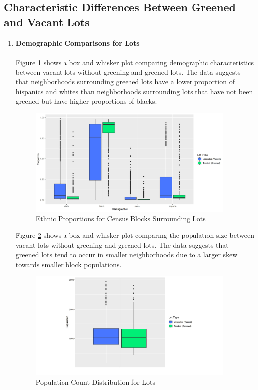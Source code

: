 \documentclass{article}
\begin{document}
\subsection{Characteristic Differences Between Greened and Vacant Lots}
\begin{enumerate}
    \item \textbf{Demographic Comparisons for Lots} \\\\
    Figure \ref{fig:figure3} shows a box and whisker plot comparing demographic characteristics between vacant lots without greening and greened lots. The data suggests that neighborhoods surrounding greened lots have a lower proportion of hispanics and whites than neighborhoods surrounding lots that have not been greened but have higher proportions of blacks.
    
    \begin{figure}[h]
    \includegraphics[width=10cm]{imgs/chart_demog.jpg}
    \centering
    \caption{Ethnic Proportions for Census Blocks Surrounding Lots}
    \label{fig:figure3}
    \end{figure}
    
    Figure \ref{fig:figure4} shows a box and whisker plot comparing the population size between vacant lots without greening and greened lots. The data suggests that greened lots tend to occur in smaller neighborhoods due to a larger skew towards smaller block populations.
    
    \begin{figure}[h]
    \includegraphics[width=10cm]{imgs/chart_pop_count.jpg}
    \centering
    \caption{Population Count Distribution for Lots}
    \label{fig:figure4}    
    \end{figure}


\end{enumerate}
\end{document}
